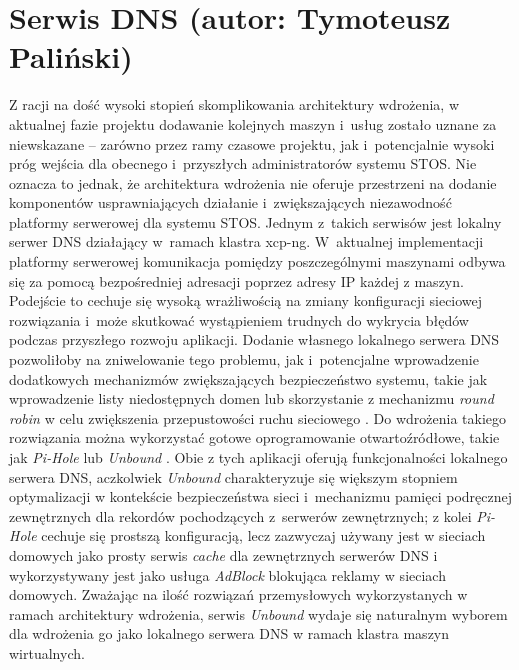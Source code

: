 \section{Serwis DNS (autor: Tymoteusz Paliński)}
Z racji na dość wysoki stopień skomplikowania architektury wdrożenia, w aktualnej fazie projektu dodawanie kolejnych maszyn i~usług zostało uznane za niewskazane -- zarówno przez ramy czasowe projektu, jak i~potencjalnie wysoki próg wejścia dla obecnego i~przyszłych administratorów systemu STOS. Nie oznacza to jednak, że architektura wdrożenia nie oferuje przestrzeni na dodanie komponentów usprawniających działanie i~zwiększających niezawodność platformy serwerowej dla systemu STOS.
\newline \noindent Jednym z~takich serwisów jest lokalny serwer DNS działający w~ramach klastra xcp-ng. W~aktualnej
implementacji platformy serwerowej komunikacja pomiędzy poszczególnymi maszynami odbywa się za pomocą bezpośredniej adresacji poprzez adresy IP każdej z maszyn. Podejście to cechuje się wysoką wrażliwością na zmiany konfiguracji sieciowej rozwiązania i~może skutkować wystąpieniem trudnych do wykrycia błędów podczas przyszłego rozwoju aplikacji. Dodanie własnego lokalnego serwera DNS pozwoliłoby na zniwelowanie tego problemu, jak i~potencjalne wprowadzenie dodatkowych mechanizmów zwiększających bezpieczeństwo systemu, takie jak wprowadzenie listy niedostępnych domen lub skorzystanie z mechanizmu \textit{round robin} w celu zwiększenia przepustowości ruchu sieciowego \cite{roundRobin}.
\newline \noindent Do wdrożenia takiego rozwiązania można wykorzystać gotowe oprogramowanie otwartoźródłowe, takie jak \textit{Pi-Hole} lub \textit{Unbound} \cite{pihole, unboundDns}. Obie z tych aplikacji oferują funkcjonalności lokalnego serwera DNS, aczkolwiek \textit{Unbound} charakteryzuje się większym stopniem optymalizacji w kontekście bezpieczeństwa sieci i~mechanizmu pamięci podręcznej zewnętrznych dla rekordów pochodzących z~serwerów zewnętrznych; z kolei \textit{Pi-Hole} cechuje się prostszą konfiguracją, lecz zazwyczaj używany jest w sieciach domowych jako prosty serwis \textit{cache} dla zewnętrznych serwerów DNS i wykorzystywany jest jako usługa \textit{AdBlock} blokująca reklamy w sieciach domowych. Zważając na ilość rozwiązań przemysłowych wykorzystanych w ramach architektury wdrożenia, serwis \textit{Unbound} wydaje się naturalnym wyborem dla wdrożenia go jako lokalnego serwera DNS w ramach klastra maszyn wirtualnych.

